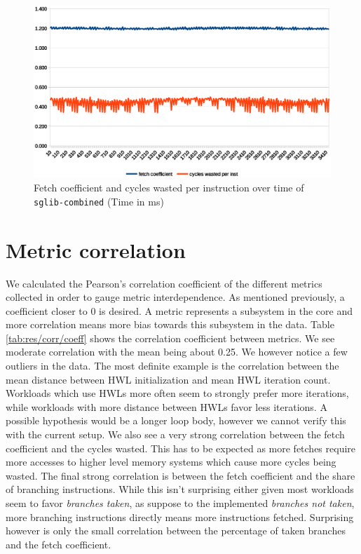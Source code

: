 \documentclass[../bachelor_paper.tex]{subfiles}
\begin{document}
\begin{figure}
    \centering
    \includegraphics[width=\textwidth]{img/graph/embench/sglib-combined_fetch_waste.eps}
    \caption{Fetch coefficient and cycles wasted per instruction over time of \texttt{sglib-combined} (Time in ms)}
    \label{fig:res/sglib/fetch_waste}
\end{figure}

\section{Metric correlation}
We calculated the Pearson's correlation coefficient of the different metrics collected in order to gauge metric interdependence. As mentioned previously, a coefficient closer to 0 is desired. A metric represents a subsystem in the core and more correlation means more bias towards this subsystem in the data. Table \ref{tab:res/corr/coeff} shows the correlation coefficient between metrics. We see moderate correlation with the mean being about 0.25. We however notice a few outliers in the data. The most definite example is the correlation between the mean distance between \ac{HWL} initialization and mean \ac{HWL} iteration count. Workloads which use \acp{HWL} more often seem to strongly prefer more iterations, while workloads with more distance between \acp{HWL} favor less iterations. A possible hypothesis would be a longer loop body, however we cannot verify this with the current setup. We also see a very strong correlation between the fetch coefficient and the cycles wasted. This has to be expected as more fetches require more accesses to higher level memory systems which cause more cycles being wasted. The final strong correlation is between the fetch coefficient and the share of branching instructions. While this isn't surprising either given most workloads seem to favor \emph{branches taken}, as suppose to the implemented \emph{branches not taken}, more branching instructions directly means more instructions fetched. Surprising however is only the small correlation between the percentage of taken branches and the fetch coefficient.
\end{document}
